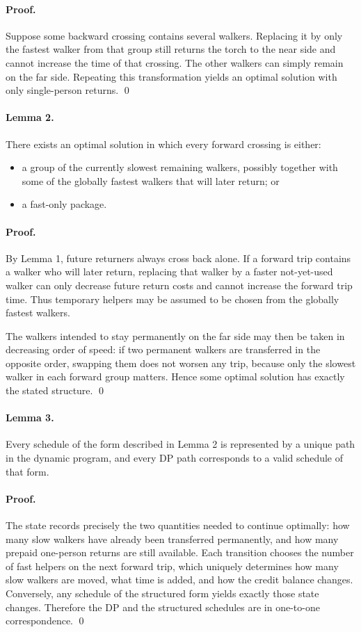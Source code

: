 \documentclass[11pt]{article}
\begin{document}
\paragraph{Proof.}
Suppose some backward crossing contains several walkers. Replacing it by only the fastest walker from
that group still returns the torch to the near side and cannot increase the time of that crossing. The other
walkers can simply remain on the far side. Repeating this transformation yields an optimal solution with
only single-person returns. \qed

\paragraph{Lemma 2.}
There exists an optimal solution in which every forward crossing is either:
\begin{itemize}[leftmargin=*]
    \item a group of the currently slowest remaining walkers, possibly together with some of the globally
    fastest walkers that will later return; or
    \item a fast-only package.
\end{itemize}

\paragraph{Proof.}
By Lemma 1, future returners always cross back alone. If a forward trip contains a walker who will later
return, replacing that walker by a faster not-yet-used walker can only decrease future return costs and
cannot increase the forward trip time. Thus temporary helpers may be assumed to be chosen from the
globally fastest walkers.

The walkers intended to stay permanently on the far side may then be taken in decreasing order of speed:
if two permanent walkers are transferred in the opposite order, swapping them does not worsen any trip,
because only the slowest walker in each forward group matters. Hence some optimal solution has exactly
the stated structure. \qed

\paragraph{Lemma 3.}
Every schedule of the form described in Lemma 2 is represented by a unique path in the dynamic
program, and every DP path corresponds to a valid schedule of that form.

\paragraph{Proof.}
The state records precisely the two quantities needed to continue optimally: how many slow walkers have
already been transferred permanently, and how many prepaid one-person returns are still available. Each
transition chooses the number of fast helpers on the next forward trip, which uniquely determines how
many slow walkers are moved, what time is added, and how the credit balance changes. Conversely, any
schedule of the structured form yields exactly those state changes. Therefore the DP and the structured
schedules are in one-to-one correspondence. \qed
\end{document}
